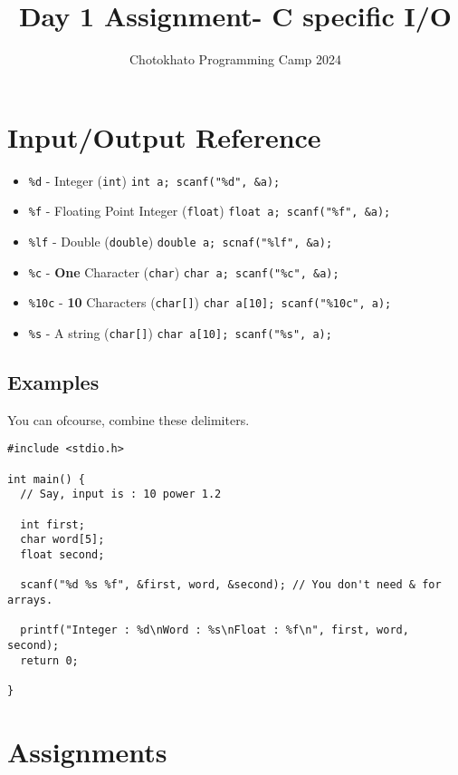 \documentclass{article}
\title{Day 1 Assignment- C specific I/O}
\author{Chotokhato Programming Camp 2024}
\begin{document}
\maketitle

\section*{Input/Output Reference}

\begin{itemize}
  \item \verb|%d| - Integer (\verb|int|) \lstinline{int a; scanf("%d", &a);}
  
  \item \verb|%f| - Floating Point Integer (\verb|float|) \lstinline{float a; scanf("%f", &a);}

  \item \verb|%lf| - Double (\verb|double|) \lstinline{double a; scnaf("%lf", &a);}

  \item \verb|%c| - \textbf{One} Character (\verb|char|) \lstinline{char a; scanf("%c", &a);}

  \item \verb|%10c| - \textbf{10} Characters (\verb|char[]|) \lstinline{char a[10]; scanf("%10c", a);}

  \item \verb|%s| - A string (\verb|char[]|) \lstinline{char a[10]; scanf("%s", a);}
\end{itemize}

\subsection*{Examples}
You can ofcourse, combine these delimiters.

\begin{lstlisting}
#include <stdio.h>

int main() {
  // Say, input is : 10 power 1.2

  int first;
  char word[5];
  float second;

  scanf("%d %s %f", &first, word, &second); // You don't need & for arrays.

  printf("Integer : %d\nWord : %s\nFloat : %f\n", first, word, second);
  return 0;

}
\end{lstlisting}

\section*{Assignments}
\end{document}
